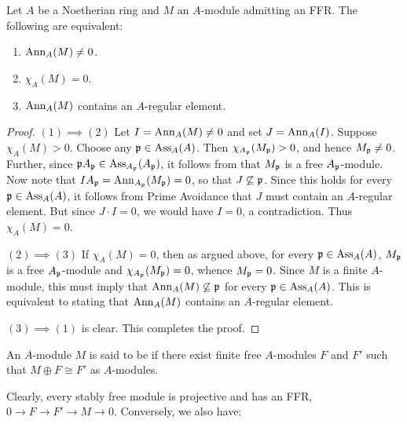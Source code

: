 \begin{theorem}
    Let $A$ be a Noetherian ring and $M$ an $A$-module admitting an FFR. The following are equivalent: 
    \begin{enumerate}[label=(\arabic*)]
        \item $\operatorname{Ann}_A(M)\ne 0$. 
        \item $\chi_A(M) = 0$. 
        \item $\operatorname{Ann}_A(M)$ contains an $A$-regular element.
    \end{enumerate}
\end{theorem}
\begin{proof}
    $(1)\implies(2)$ Let $I = \operatorname{Ann}_A(M)\ne 0$ and set $J = \operatorname{Ann}_A(I)$. Suppose $\chi_A(M) > 0$. Choose any $\mathfrak{p}\in\operatorname{Ass}_A(A)$. Then $\chi_{A_{\mathfrak{p}}}(M_{\mathfrak{p}}) > 0$, and hence $M_{\mathfrak{p}}\ne 0$. Further, since $\mathfrak{p} A_{\mathfrak{p}}\in\operatorname{Ass}_{A_{\mathfrak{p}}}(A_{\mathfrak{p}})$, it follows from  that $M_{\mathfrak{p}}$ is a free $A_{\mathfrak{p}}$-module. Now note that $I A_{\mathfrak{p}} = \operatorname{Ann}_{A_{\mathfrak{p}}}(M_{\mathfrak{p}}) = 0$, so that $J\not\subseteq\mathfrak{p}$. Since this holds for every $\mathfrak{p}\in\operatorname{Ass}_A(A)$, it follows from Prime Avoidance that $J$ must contain an $A$-regular element. But since $J\cdot I = 0$, we would have $I = 0$, a contradiction. Thus $\chi_A(M) = 0$.

    $(2)\implies(3)$ If $\chi_A(M) = 0$, then as argued above, for every $\mathfrak{p}\in\operatorname{Ass}_A(A)$, $M_{\mathfrak{p}}$ is a free $A_{\mathfrak{p}}$-module and $\chi_{A_{\mathfrak{p}}}(M_{\mathfrak{p}}) = 0$, whence $M_{\mathfrak{p}} = 0$. Since $M$ is a finite $A$-module, this must imply that $\operatorname{Ann}_A(M)\not\subseteq\mathfrak{p}$ for every $\mathfrak{p}\in\operatorname{Ass}_A(A)$. This is equivalent to stating that $\operatorname{Ann}_A(M)$ contains an $A$-regular element. 

    $(3)\implies(1)$ is clear. This completes the proof.
\end{proof}

\begin{definition}
    An $A$-module $M$ is said to be  if there exist finite free $A$-modules $F$ and $F'$ such that $M\oplus F\cong F'$ as $A$-modules.
\end{definition}

Clearly, every stably free module is projective and has an FFR, $0\to F\to F'\to M\to 0$. Conversely, we also have: 

